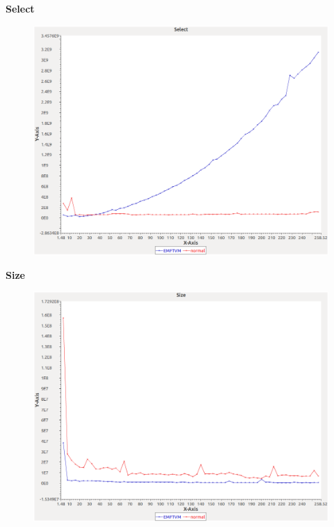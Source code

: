 \noindent\textbf{Select}

\begin{figure}[h]
\centering
\includegraphics[width=\textwidth]{../graphs/bag/Select}
\end{figure}
\pagebreak

\noindent\textbf{Size}

\begin{figure}[h]
\centering
\includegraphics[width=\textwidth]{../graphs/bag/Size}
\end{figure}
\pagebreak

